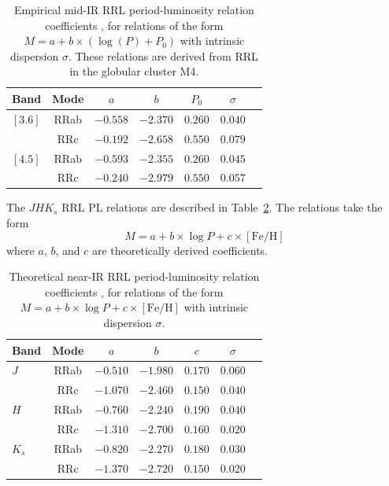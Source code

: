 \documentclass[a4paper,fleqn,usenatbib]{mnras}
\begin{document}

\begin{table}
\centering
\caption{Empirical mid-IR RRL period-luminosity relation coefficients \citep{2015ApJ...808...11N}, for relations of the form $M = a + b \times (\log (P) + P_0)$ with intrinsic dispersion $\sigma$. These relations are derived from RRL in the globular cluster M4.} 
\label{tab:pl_table_m4}
\begin{tabular}{l||c|c|c|c|c|r} 
\hline \hline
Band & Mode & $a$ & $b$ & $P_0$ & $\sigma$ \\
\hline
$[3.6]$ & RRab & $-0.558$ & $-2.370$ & $0.260$ & $0.040$ \\
            & RRc & $-0.192$ & $-2.658$ & $0.550$ & $0.079$ \\
$[4.5]$ & RRab & $-0.593$ & $-2.355$ & $0.260$ & $0.045$ \\
            & RRc & $-0.240$ & $-2.979$ & $0.550$ & $0.057$ \\ 
            \hline
\end{tabular}
\end{table}

The $JHK_s$ RRL PL relations are described in Table~\ref{tab:pl_table_theo}. The relations take the form
\begin{equation}M = a + b\times\log P + c\times[\text{Fe/H}]\end{equation}
where $a$, $b$, and $c$ are theoretically derived coefficients.

\begin{table}
\centering
\caption{Theoretical near-IR RRL period-luminosity relation coefficients \citep{2015ApJ...808...50M}, for relations of the form $M = a + b \times \log P + c \times [\text{Fe/H}]$ with intrinsic dispersion $\sigma$.}
\label{tab:pl_table_theo}
\begin{tabular}{l||c|c|c|c|c|r} 
\hline \hline
Band & Mode & $a$   & $b$   & $c$   & $\sigma$ \\
\hline
$J$ & RRab & $-0.510$ & $-1.980$ & $0.170$ & $0.060$ \\
       & RRc & $-1.070$ & $-2.460$ & $0.150$ & $0.040$ \\
$H$ & RRab & $-0.760$ & $-2.240$ & $0.190$ & $0.040$\\
       & RRc & $-1.310$ & $-2.700$ & $0.160$ & $0.020$\\
$K_s$ & RRab & $-0.820$ & $-2.270$ & $0.180$ & $0.030$\\
           & RRc & $-1.370$ & $-2.720$ & $0.150$ & $0.020$ \\       
\hline
\end{tabular}
\end{table}
\end{document}
